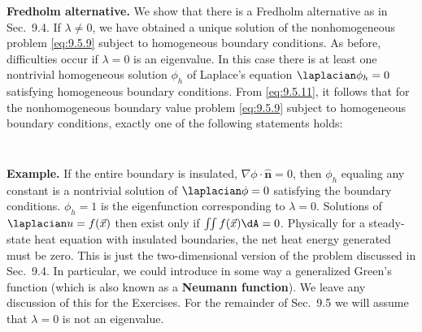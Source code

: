 \textbf{Fredholm alternative.}
We show that there is a Fredholm alternative as in Sec.~9.4.  If $\lambda \neq 0$, we have obtained a unique solution of the nonhomogeneous problem \eqref{eq:9.5.9} subject to homogeneous boundary conditions.  As before, difficulties occur if $\lambda = 0$ is an eigenvalue.  In this case there is at least one nontrivial homogeneous solution $\phi_h$ of Laplace's equation $\laplacian\phi_h = 0$ satisfying homogeneous boundary conditions.  From \eqref{eq:9.5.11}, it follows that for the nonhomogeneous boundary value problem \eqref{eq:9.5.9} subject to homogeneous boundary conditions, exactly one of the following statements holds:

\begin{center}
\end{center}
\begin{equation}
\label{eq:9.5.14}
\tag{9.5.14}
\end{equation}

\begin{center}
\end{center}
\begin{equation}
\label{eq:9.5.15}
\tag{9.5.15}
\end{equation}

\textbf{Example.}
If the entire boundary is insulated, $\nabla\phi\cdot\hat{\mathbf{n}} = 0$, then $\phi_h$ equaling any constant is a nontrivial solution of $\laplacian\phi = 0$ satisfying the boundary conditions.  $\phi_h = 1$ is the eigenfunction corresponding to $\lambda = 0$.  Solutions of $\laplacian u = f(\vec{x})$ then exist only if $\iint f(\vec{x})\dA = 0$.  Physically for a steady-state heat equation with insulated boundaries, the net heat energy generated must be zero.  This is just the two-dimensional version of the problem discussed in Sec.~9.4.  In particular, we could introduce in some way a generalized Green's function (which is also known as a \textbf{Neumann function}).  We leave any discussion of this for the Exercises.  For the remainder of Sec.~9.5 we will assume that $\lambda = 0$ is not an eigenvalue.

